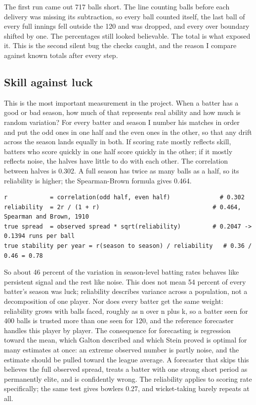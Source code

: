 \documentclass[11pt,letterpaper]{article}
\begin{document}
The first run came out 717 balls short. The line counting balls before each delivery was missing its subtraction, so every ball counted itself, the last ball of every full innings fell outside the 120 and was dropped, and every over boundary shifted by one. The percentages still looked believable. The total is what exposed it. This is the second silent bug the checks caught, and the reason I compare against known totals after every step.


\subsection{Skill against luck}

This is the most important measurement in the project. When a batter has a good or bad season, how much of that represents real ability and how much is random variation? For every batter and season I number his matches in order and put the odd ones in one half and the even ones in the other, so that any drift across the season lands equally in both. If scoring rate mostly reflects skill, batters who score quickly in one half score quickly in the other; if it mostly reflects noise, the halves have little to do with each other. The correlation between halves is 0.302. A full season has twice as many balls as a half, so its reliability is higher; the Spearman-Brown formula gives 0.464.


\begin{lstlisting}
r            = correlation(odd half, even half)              # 0.302
reliability  = 2r / (1 + r)                                # 0.464, Spearman and Brown, 1910
true spread  = observed spread * sqrt(reliability)         # 0.2047 -> 0.1394 runs per ball
true stability per year = r(season to season) / reliability   # 0.36 / 0.46 = 0.78
\end{lstlisting}

So about 46 percent of the variation in season-level batting rates behaves like persistent signal and the rest like noise. This does not mean 54 percent of every batter's season was luck; reliability describes variance across a population, not a decomposition of one player. Nor does every batter get the same weight: reliability grows with balls faced, roughly as n over n plus k, so a batter seen for 400 balls is trusted more than one seen for 120, and the reference forecaster handles this player by player. The consequence for forecasting is regression toward the mean, which Galton described and which Stein proved is optimal for many estimates at once: an extreme observed number is partly noise, and the estimate should be pulled toward the league average. A forecaster that skips this believes the full observed spread, treats a batter with one strong short period as permanently elite, and is confidently wrong. The reliability applies to scoring rate specifically; the same test gives bowlers 0.27, and wicket-taking barely repeats at all.
\end{document}
